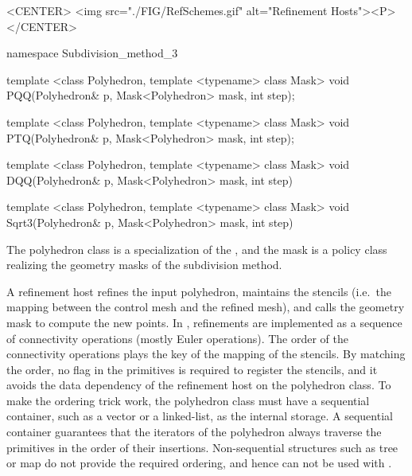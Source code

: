 \begin{ccHtmlOnly}
  <CENTER>
     <img src="./FIG/RefSchemes.gif" alt="Refinement Hosts"><P>
  </CENTER>
\end{ccHtmlOnly}


\begin{ccExampleCode}
namespace Subdivision_method_3 {
  template <class Polyhedron, template <typename> class Mask>
  void PQQ(Polyhedron& p, Mask<Polyhedron> mask, int step);

  template <class Polyhedron, template <typename> class Mask>
  void PTQ(Polyhedron& p, Mask<Polyhedron> mask, int step);

  template <class Polyhedron, template <typename> class Mask>
  void DQQ(Polyhedron& p, Mask<Polyhedron> mask, int step)

  template <class Polyhedron, template <typename> class Mask>
  void Sqrt3(Polyhedron& p, Mask<Polyhedron> mask, int step)
}
\end{ccExampleCode}


The polyhedron class is a specialization of the 
, and the mask is a policy 
class realizing the geometry masks of the subdivision 
method.

A refinement host refines the input polyhedron, maintains 
the stencils (i.e.~the mapping between the control mesh 
and the refined mesh), and calls the geometry mask 
to compute the new points. 
In , refinements are implemented
as a sequence of connectivity operations (mostly Euler operations).
The order of the connectivity operations plays the key of the mapping 
of the stencils. By matching the order, no flag in the primitives 
is required to register the stencils, and it avoids the data 
dependency of the refinement host on the polyhedron class. 
To make the ordering trick work, the polyhedron class must 
have a sequential container, such as a vector or a linked-list, as
the internal storage. 
A sequential container guarantees that the iterators of the 
polyhedron always traverse the primitives in the order of their 
insertions. Non-sequential structures such as 
tree or map do not provide the required ordering, and hence
can not be used with .
 
